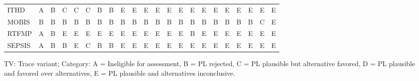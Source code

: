 {\begin{tabular}{lccccccccccccccccccccc}
ITHD & \cellcolor[HTML]{FFFFFF} A & \cellcolor[HTML]{EA4646} B & \cellcolor[HTML]{9670BD} C & \cellcolor[HTML]{9670BD} C & \cellcolor[HTML]{9670BD} C & \cellcolor[HTML]{EA4646} B & \cellcolor[HTML]{EA4646} B & \cellcolor[HTML]{19C8C8} E & \cellcolor[HTML]{19C8C8} E & \cellcolor[HTML]{19C8C8} E & \cellcolor[HTML]{19C8C8} E & \cellcolor[HTML]{19C8C8} E & \cellcolor[HTML]{19C8C8} E & \cellcolor[HTML]{19C8C8} E & \cellcolor[HTML]{19C8C8} E & \cellcolor[HTML]{19C8C8} E & \cellcolor[HTML]{19C8C8} E & \cellcolor[HTML]{19C8C8} E & \cellcolor[HTML]{19C8C8} E & \cellcolor[HTML]{19C8C8} E & \cellcolor[HTML]{19C8C8} E \\
MOBIS & \cellcolor[HTML]{EA4646} B & \cellcolor[HTML]{EA4646} B & \cellcolor[HTML]{EA4646} B & \cellcolor[HTML]{EA4646} B & \cellcolor[HTML]{EA4646} B & \cellcolor[HTML]{EA4646} B & \cellcolor[HTML]{EA4646} B & \cellcolor[HTML]{EA4646} B & \cellcolor[HTML]{EA4646} B & \cellcolor[HTML]{EA4646} B & \cellcolor[HTML]{EA4646} B & \cellcolor[HTML]{EA4646} B & \cellcolor[HTML]{EA4646} B & \cellcolor[HTML]{EA4646} B & \cellcolor[HTML]{EA4646} B & \cellcolor[HTML]{EA4646} B & \cellcolor[HTML]{EA4646} B & \cellcolor[HTML]{EA4646} B & \cellcolor[HTML]{EA4646} B & \cellcolor[HTML]{9670BD} C & \cellcolor[HTML]{19C8C8} E \\
RTFMP & \cellcolor[HTML]{FFFFFF} A & \cellcolor[HTML]{EA4646} B & \cellcolor[HTML]{19C8C8} E & \cellcolor[HTML]{19C8C8} E & \cellcolor[HTML]{19C8C8} E & \cellcolor[HTML]{19C8C8} E & \cellcolor[HTML]{19C8C8} E & \cellcolor[HTML]{19C8C8} E & \cellcolor[HTML]{19C8C8} E & \cellcolor[HTML]{19C8C8} E & \cellcolor[HTML]{19C8C8} E & \cellcolor[HTML]{19C8C8} E & \cellcolor[HTML]{19C8C8} E & \cellcolor[HTML]{EA4646} B & \cellcolor[HTML]{19C8C8} E & \cellcolor[HTML]{19C8C8} E & \cellcolor[HTML]{19C8C8} E & \cellcolor[HTML]{19C8C8} E & \cellcolor[HTML]{19C8C8} E & \cellcolor[HTML]{19C8C8} E & \cellcolor[HTML]{19C8C8} E \\
SEPSIS & \cellcolor[HTML]{FFFFFF} A & \cellcolor[HTML]{EA4646} B & \cellcolor[HTML]{EA4646} B & \cellcolor[HTML]{19C8C8} E & \cellcolor[HTML]{9670BD} C & \cellcolor[HTML]{EA4646} B & \cellcolor[HTML]{EA4646} B & \cellcolor[HTML]{19C8C8} E & \cellcolor[HTML]{19C8C8} E & \cellcolor[HTML]{19C8C8} E & \cellcolor[HTML]{19C8C8} E & \cellcolor[HTML]{19C8C8} E & \cellcolor[HTML]{19C8C8} E & \cellcolor[HTML]{19C8C8} E & \cellcolor[HTML]{19C8C8} E & \cellcolor[HTML]{19C8C8} E & \cellcolor[HTML]{19C8C8} E & \cellcolor[HTML]{19C8C8} E & \cellcolor[HTML]{19C8C8} E & \cellcolor[HTML]{19C8C8} E & \cellcolor[HTML]{19C8C8} E \\
\bottomrule
\end{tabular}
}
\begin{center}\footnotesize
TV: Trace variant; \quad Category: A = Ineligible for assessment, B = PL rejected, C = PL plausible but alternative favored, D = PL plausible and favored over alternatives, E = PL plausible and alternatives inconclusive.
\end{center}
